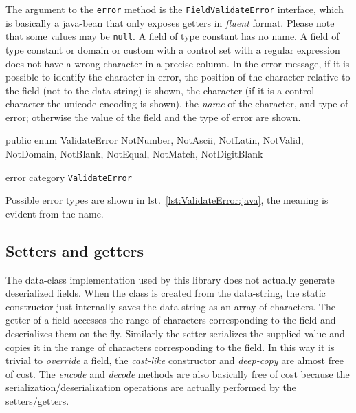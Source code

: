 \documentclass[a4paper,10pt]{report}
\newenvironment{elisting}[1][H]
  {\captionsetup{aboveskip=0pt}\begin{listing}[#1]}
  {\end{listing}%
}
\begin{document}
The argument to the \texttt{error} method is the \texttt{FieldValidateError} 
interface, which is basically a java-bean that only exposes getters in 
\textit{fluent} format. 
Please note that some values may be \texttt{null}. A field of type constant has 
no name. A field of type constant or domain or custom with a control set with a 
regular expression does not have a wrong character in a precise column. 
In the error message, if it is possible to identify the character in error, the 
position of the character relative to the field (not to the data-string) is 
shown, the character (if it is a control character the unicode encoding is 
shown), the \textit{name} of the character, and type of error; otherwise the 
value of the field and the type of error are shown.

\begin{elisting}[!htb]
\begin{javacode}
public enum ValidateError {
    NotNumber, NotAscii, NotLatin, NotValid, NotDomain, NotBlank, NotEqual, NotMatch, NotDigitBlank
}
\end{javacode}
\caption{error category \texttt{ValidateError}}
\label{lst:ValidateError:java}
\end{elisting}

Possible error types are shown in lst.~\ref{lst:ValidateError:java}, the meaning 
is evident from the name.

\subsection{Setters and getters}
The data-class implementation used by this library does not actually generate 
deserialized fields. When the class is created from the data-string, the static 
constructor just internally saves the data-string as an array of characters. 
The getter of a field accesses the range of characters corresponding to the 
field and deserializes them on the fly. 
Similarly the setter serializes the supplied value and copies it in the range of 
characters corresponding to the field. 
In this way it is trivial to \textsl{override} a field, the \textit{cast-like} 
constructor and \textit{deep-copy} are almost free of cost. 
The \textsl{encode} and \textsl{decode} methods are also basically free of cost 
because the serialization/deserialization operations are actually performed by 
the setters/getters.
\end{document}
